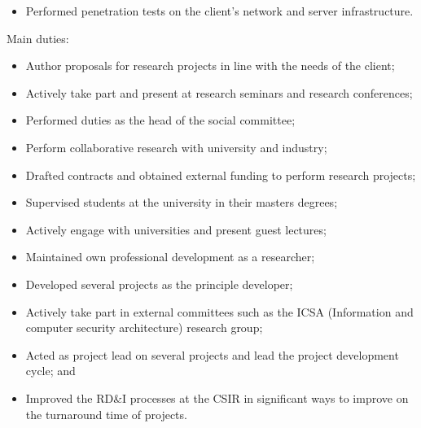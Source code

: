 \documentclass[11pt,a4paper,sans]{moderncv/moderncv}        %
\begin{document}
{\begin{itemize}
\item Performed penetration tests on the client's network and server infrastructure.
\end{itemize}
Main duties:%
\begin{itemize}%
\item Author proposals for research projects in line with the needs of the client;
\item Actively take part and present at research seminars and research conferences;
\item Performed duties as the head of the social committee;
\item Perform collaborative research with university and industry;
\item Drafted contracts and obtained external funding to perform research projects;
\item Supervised students at the university in their masters degrees;
\item Actively engage with universities and present guest lectures;
\item Maintained own professional development as a researcher;
\item Developed several projects as the principle developer;
\item Actively take part in external committees such as the ICSA (Information and computer security architecture) research group; 
\item Acted as project lead on several projects and lead the project development cycle; and
\item Improved the RD\&I processes at the CSIR in significant ways to improve on the turnaround time of projects.
\end{itemize}}
\end{document}
